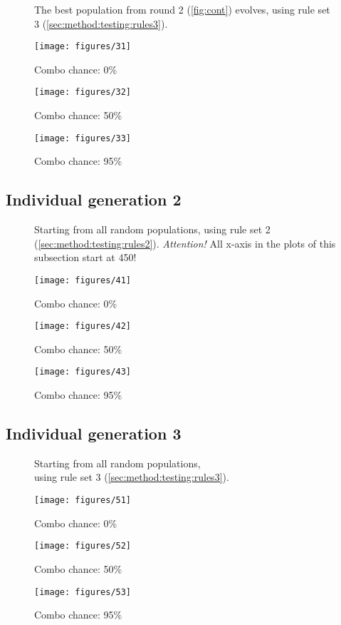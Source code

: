 \begin{figure*}[htbp]     
	\caption[From rules 2 to rules 3]{The best population from round 2 (\ref{fig:cont}) evolves, using  rule set 3 (\ref{sec:method:testing:rules3}).}   
	
	\texttt{[image: figures/31]} %
	\label{fig:r2_to_r3:c0}%
	\caption{Combo chance: 0\%}%
	
	\texttt{[image: figures/32]} %
	\label{fig:r2_to_r3:c50}%
	\caption{Combo chance: 50\%}%
	
	\texttt{[image: figures/33]} %
	\label{fig:r2_to_r3:c95}%
	\caption{Combo chance: 95\%}%
\end{figure*}



\subsection{Individual generation 2}
\label{fig:individual2}

\begin{figure*}[hbt]
	\caption[From random to rules 2]{Starting from all random populations, using rule set 2 (\ref{sec:method:testing:rules2}). \emph{Attention!} All x-axis in the plots of this subsection start at 450!} 
	
	\texttt{[image: figures/41]}%
	\label{fig:random_to_r2:c0}%
	\caption{Combo chance: 0\%}%
	
	\texttt{[image: figures/42]}%
	\label{fig:random_to_r2:c50}%
	\caption{Combo chance: 50\%}%
	
	\texttt{[image: figures/43]} %
	\label{fig:random_to_r2:c95}%
	\caption{Combo chance: 95\%}%
\end{figure*}



\subsection{Individual generation 3}
\label{fig:individual3}

\begin{figure*}[htbp]     
	\caption[From random to rules 3]{Starting from all random populations, \\using rule set 3 (\ref{sec:method:testing:rules3}).} 
	
	\texttt{[image: figures/51]} %
	\label{fig:random_to_r3:c0}%
	\caption{Combo chance: 0\%}%
	
	\texttt{[image: figures/52]} %
	\label{fig:random_to_r3:c50}%
	\caption{Combo chance: 50\%}%
	
	\texttt{[image: figures/53]} %
	\label{fig:random_to_r3:c95}%
	\caption{Combo chance: 95\%}%
\end{figure*}